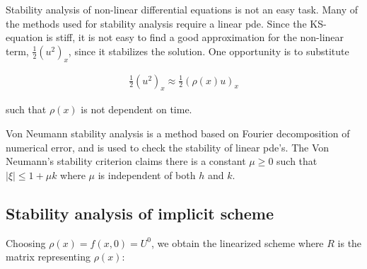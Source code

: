 Stability analysis of non-linear differential equations is not an easy task. Many of the methods used for stability analysis require a linear pde. Since the KS-equation is stiff, it is not easy to find a good approximation for the non-linear term, $\frac{1}{2}(u^2)_x$, since it stabilizes the solution. One opportunity is to substitute 

\begin{align*}
\frac{1}{2}(u^2)_x \approx \frac{1}{2}(\rho(x)u)_x
\end{align*} 

such that $\rho(x)$ is not dependent on time. 

Von Neumann stability analysis is a method based on Fourier decomposition of numerical error, and is used to check the stability of linear pde's. The Von Neumann's stability criterion claims there is a constant $\mu \ge 0$ such that $|\xi| \le 1+ \mu k$ where $\mu$ is independent of both $h$ and $k$.


\subsection{Stability analysis of implicit scheme}

 
Choosing $\rho(x) = f(x,0) = U^0$, we obtain the linearized scheme where $R$ is the matrix representing $\rho(x)$:


